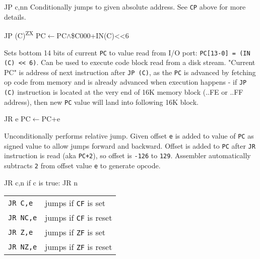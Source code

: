 \documentclass[12pt,twoside,openright,a4paper]{book}
\newcommand{\ZXN}{\textnormal{\textsuperscript{ZX}}}
\begin{document}
\begin{basedescript}{
	\desclabelstyle{\multilinelabel}
	\desclabelwidth{3cm}}
\begin{detailitem}{JP c,nn}
		Conditionally jumps to given absolute address. See {\tt CP} above for more details.

		\DetailNoEffect
				
		\begin{DetailTiming}
		\end{DetailTiming}

	\end{detailitem}

	\begin{detailitem}{JP (C)\ZXN}
		{PC$\leftarrow$PC$\wedge$\$C000+IN(C)<<6}

		Sets bottom 14 bits of current {\tt PC} to value read from I/O port: {\tt PC[13-0] = (IN (C) << 6)}. Can be used to execute code block read from a disk stream. "Current PC" is address of next instruction after {\tt JP (C)}, as the {\tt PC} is advanced by fetching op code from memory and is already advanced when execution happens - if {\tt JP (C)} instruction is located at the very end of 16K memory block (..FE or ..FF address), then new {\tt PC} value will land into following 16K block.

		\DetailNoEffect
				
		\begin{DetailTiming}
			\DetailTime{}{3}{13}
		\end{DetailTiming}

	\end{detailitem}

	\pagebreak
	\begin{detailitem}{JR e}
		{PC$\leftarrow$PC+e}
		
		Unconditionally performs relative jump. Given offset {\tt e} is added to value of {\tt PC} as signed value to allow jumps forward and backward. Offset is added to {\tt PC} after {\tt JR} instruction is read (aka {\tt PC+2}), so offset is {\tt -126} to {\tt 129}. Assembler automatically subtracts {\tt 2} from offset value {\tt e} to generate opcode.

		\DetailNoEffect
				
		\begin{DetailTiming}
			\DetailTime{}{3}{12}
		\end{DetailTiming}

	\end{detailitem}

	\begin{detailitem}{JR c,n}
		{if c is true: JR n}

		\vspace{1ex} %
		\begin{tabular}{@{}ll}
			{\tt JR C,e} & jumps if {\tt CF} is set\\
			{\tt JR NC,e} & jumps if {\tt CF} is reset\\
			{\tt JR Z,e} & jumps if {\tt ZF} is set\\
			{\tt JR NZ,e} & jumps if {\tt ZF} is reset\\
		\end{tabular}
		

\end{detailitem}
\end{basedescript}
\end{document}
